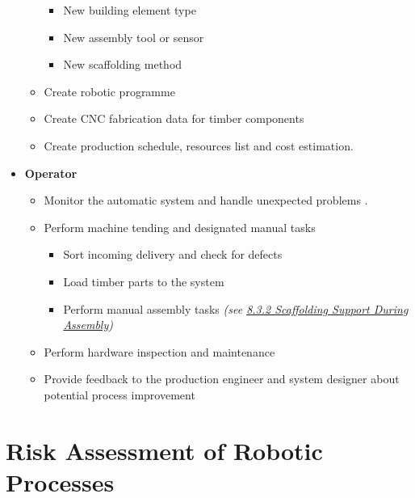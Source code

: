 \begin{itemize}
\begin{itemize}
\begin{itemize}
			\item New building element type

			\item New assembly tool or sensor

			\item New scaffolding method

		\end{itemize}
		\item Create robotic programme 
		\item Create CNC fabrication data for timber components  
		\item Create production schedule, resources list and cost estimation.
	\end{itemize}

	\item \textbf{Operator}

	\begin{itemize}
		\item Monitor the automatic system and handle unexpected problems .

		\item Perform machine tending and designated manual tasks 

		\begin{itemize}
			\item Sort incoming delivery and check for defects 
			\item Load timber parts to the system
			\item Perform manual assembly tasks \textit{(see \ul{8.3.2 Scaffolding Support During Assembly})}
		\end{itemize}

		\item Perform hardware inspection and maintenance

		\item Provide feedback to the production engineer and system designer about potential process improvement

	\end{itemize}
\end{itemize}

\section{Risk Assessment of Robotic Processes}
\label{section:discussion-risk-assessment-of-robotic-processes}

